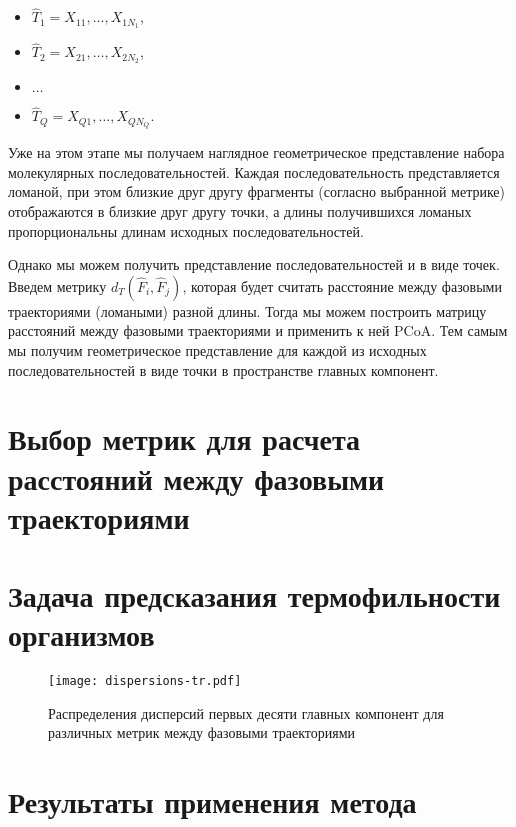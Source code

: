 \begin{itemize}
  \item $\hat{T}_1 = X_{11},\ldots,X_{1 N_1}$,
  \item $\hat{T}_2 = X_{21},\ldots,X_{2 N_2}$,
  \item $\ldots$
  \item $\hat{T}_Q = X_{Q1},\ldots,X_{Q N_Q}$.
\end{itemize}

Уже на этом этапе мы получаем наглядное геометрическое представление набора молекулярных последовательностей. Каждая последовательность представляется ломаной, при этом близкие друг другу фрагменты (согласно выбранной метрике) отображаются в близкие друг другу точки, а длины получившихся ломаных пропорциональны длинам исходных последовательностей.

Однако мы можем получить представление последовательностей и в виде точек. Введем метрику $d_T(\hat{F}_i, \hat{F}_j)$, которая будет считать расстояние между фазовыми траекториями (ломаными) разной длины. Тогда мы можем построить матрицу расстояний между фазовыми траекториями и применить к ней PCoA. Тем самым мы получим геометрическое представление для каждой из исходных последовательностей в виде точки в пространстве главных компонент.

\section{Выбор метрик для расчета расстояний между фазовыми траекториями}

\section{Задача предсказания термофильности организмов}

\begin{figure}[!t]
  \centering
  \texttt{[image: dispersions-tr.pdf]}
  \caption{Распределения дисперсий первых десяти главных компонент для различных метрик между фазовыми траекториями}
  \label{dispersions-tr}
\end{figure}

\section{Результаты применения метода}

